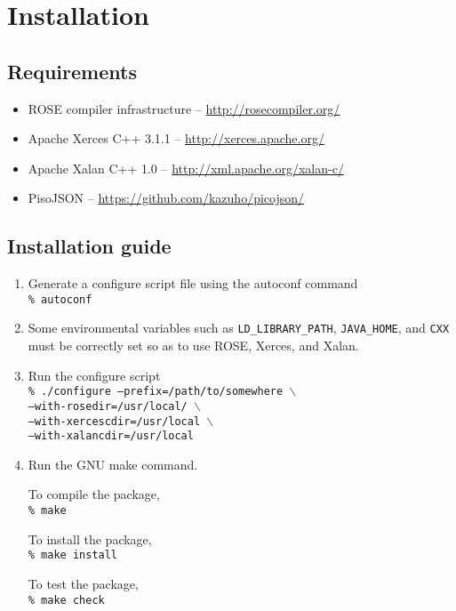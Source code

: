 
\chapter{Installation}\label{chap:app}


\section{Requirements}

\begin{itemize}
 \item ROSE compiler infrastructure -- \url{http://rosecompiler.org/}
 \item Apache Xerces C++ 3.1.1 -- \url{http://xerces.apache.org/}
 \item Apache Xalan C++ 1.0 -- \url{http://xml.apache.org/xalan-c/}
 \item PisoJSON -- \url{https://github.com/kazuho/picojson/}
\end{itemize}




\section{Installation guide}
\begin{enumerate}
 \item Generate a configure script file using the autoconf command\\

       \texttt{\% autoconf}

 \item Some environmental variables such as \texttt{LD\_LIBRARY\_PATH},
       \texttt{JAVA\_HOME}, and \texttt{CXX} must be correctly set so as to
       use ROSE, Xerces, and Xalan.

 \item Run the configure script\\
       
       \texttt{\% ./configure --prefix=/path/to/somewhere $\backslash$}\\
       \hspace{75pt}\texttt{--with-rosedir=/usr/local/    $\backslash$}\\
       \hspace{75pt}\texttt{--with-xercescdir=/usr/local  $\backslash$}\\
       \hspace{75pt}\texttt{--with-xalancdir=/usr/local}

 \item Run the GNU make command.

   To compile the package,\\
       \texttt{\% make}

   To install the package,\\
       \texttt{\% make install}

   To test the package,\\
       \texttt{\% make check}
\end{enumerate}
